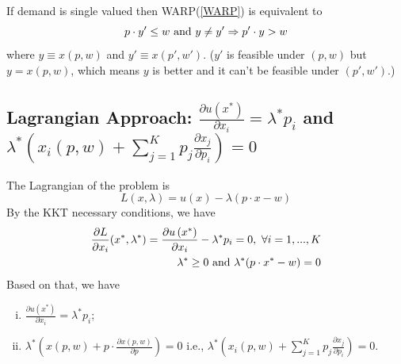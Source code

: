 \documentclass[11pt]{elegantbook}
\begin{document}
\begin{proposition}
    If demand is single valued then WARP(\ref{WARP}) is equivalent to $$p\cdot y'\leq w \textnormal{ and }y\neq y' \Rightarrow p'\cdot y>w$$
    where $y\equiv x(p,w)$ and $y'\equiv x(p',w')$.
    ($y'$ is feasible under $(p,w)$ but $y=x(p,w)$, which means $y$ is better and it can't be feasible under $(p',w')$.)
\end{proposition}

\subsection{Lagrangian Approach: $\frac{\partial u\left(x^{*}\right)}{\partial x_{i}}=\lambda^{*} p_{i}$ and $\lambda^*\left(x_i(p,w)+\sum_{j=1}^{K} p_{j} \frac{\partial x_{j}}{\partial p_{i}}\right)=0$}
The Lagrangian of the problem is $$L(x,\lambda)=u(x)-\lambda(p \cdot x-w)$$
By the KKT necessary conditions, we have
\begin{equation}
    \begin{aligned}
        \frac{\partial L}{\partial x_{i}}(x^*,\lambda^*)=\frac{\partial u\left(x^{*}\right)}{\partial x_{i}}-\lambda^{*} p_{i}=0,\ \forall i=1,...,K\\
        \lambda^*\geq 0 \textnormal{ and } \lambda^*(p\cdot x^*-w)=0
    \end{aligned}
    \nonumber
\end{equation}
Based on that, we have
\begin{lemma}
    \begin{enumerate}[(i).]
        \item $\frac{\partial u\left(x^{*}\right)}{\partial x_{i}}=\lambda^{*} p_{i}$;
        \item $\lambda^*\left(x(p,w)+p\cdot\frac{\partial x(p,w)}{\partial p}\right)=0$ i.e., $\lambda^*\left(x_i(p,w)+\sum_{j=1}^{K} p_{j} \frac{\partial x_{j}}{\partial p_{i}}\right)=0$.
    \end{enumerate}
\end{lemma}
\end{document}
